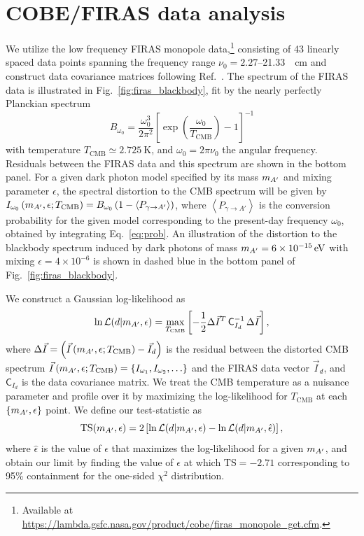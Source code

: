 \documentclass[prd,aps,10pt,nofootinbib,twocolumn,superscriptaddress,preprintnumbers,balancelastpage,longbibliography]{revtex4-1}
\begin{document}
\appendix

\section{COBE/FIRAS data analysis}
\label{app:firas_data}

We utilize the low frequency FIRAS monopole data,\footnote{Available at \url{https://lambda.gsfc.nasa.gov/product/cobe/firas_monopole_get.cfm}.} consisting of 43 linearly spaced data points spanning the frequency range $\nu_0 = 2.27$--\SI{21.33}{\per\cm} and construct data covariance matrices following Ref.~\cite{Fixsen:1996nj}. The spectrum of the FIRAS data is illustrated in Fig.~\ref{fig:firas_blackbody}, fit by the nearly perfectly Planckian spectrum
\begin{equation}
B_{\omega_0}=\frac{\omega_0^{3}}{2 \pi^{2}}\left[\exp \left(\frac{\omega_0}{T_\mathrm{CMB}}\right)-1\right]^{-1}
\end{equation}
with temperature $T_\mathrm{CMB} \simeq \SI{2.725}{\kelvin}$, and $\omega_0 = 2\pi\nu_0$ the angular frequency. Residuals between the FIRAS data and this spectrum are shown in the bottom panel. For a given dark photon model specified by its mass $m_{A^\prime}$ and mixing parameter $\epsilon$, the spectral distortion to the CMB spectrum will be given by $I_{\omega_0}\left(m_{A^\prime}, \epsilon;T_\mathrm{CMB}\right)=B_{\omega_0}\left(1- \left< P_{\gamma \rightarrow A'} \right>\right)$, where $\left\langle P_{\gamma \rightarrow A'} \right\rangle$ is the conversion probability for the given model corresponding to the present-day frequency $\omega_0$, obtained by integrating Eq.~\eqref{eq:prob}. An illustration of the distortion to the blackbody spectrum induced by dark photons of mass $\mAp = \SI{6e-15}{\eV}$ with mixing $\epsilon=4\times10^{-6}$ is shown in dashed blue in the bottom panel of Fig.~\ref{fig:firas_blackbody}.

We construct a Gaussian log-likelihood as
%
\begin{equation}
    \ln\mathcal L(d|m_{A^\prime}, \epsilon)  = \max_{T_\mathrm{CMB}}\left[-\frac{1}{2}\Delta \vec I^T\,\mathsf C_{I_d}^{-1}\,\Delta \vec I\right],
\end{equation}
%
where $\Delta \vec I = \left(\vec I \left(m_{A^\prime}, \epsilon;T_\mathrm{CMB}\right) - \vec I_d\right)$ is the residual between the distorted CMB spectrum $\vec I \left(m_{A^\prime}, \epsilon;T_\mathrm{CMB}\right) = \left\{I_{\omega_1}, I_{\omega_2},\ldots\right\}$ and the FIRAS data vector $\vec I_d$, and $\mathsf C_{I_d}$ is the data covariance matrix. We treat the CMB temperature as a nuisance parameter and profile over it by maximizing the log-likelihood for $T_\mathrm{CMB}$ at each $\{m_{A^\prime}, \epsilon\}$ point. We define our test-statistic as 
%
\begin{equation}
\mathrm{TS}(m_{A^\prime}, \epsilon) = 2\left[\ln\mathcal L(d|m_{A^\prime}, \epsilon) - \ln\mathcal L(d|m_{A^\prime}, \hat\epsilon)\right], 
\end{equation}
% 
where $\hat\epsilon$ is the value of $\epsilon$ that maximizes the log-likelihood for a given $m_{A^\prime}$, and obtain our limit by finding the value of $\epsilon$ at which $\mathrm{TS} = -2.71$ corresponding to 95\% containment for the one-sided $\chi^2$ distribution.
\end{document}
